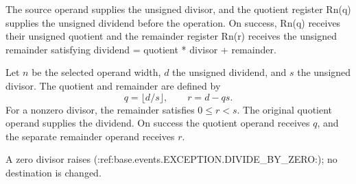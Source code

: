 The source operand supplies the unsigned divisor, and the quotient register Rn(q) supplies the unsigned dividend before the operation. On success, Rn(q) receives their unsigned quotient and the remainder register Rn(r) receives the unsigned remainder satisfying dividend = quotient * divisor + remainder.


Let \(n\) be the selected operand width, \(d\) the unsigned dividend, and \(s\) the unsigned divisor. The quotient and remainder are defined by
\[
  q = \lfloor d/s \rfloor,
  \qquad r = d - qs .
\]
For a nonzero divisor, the remainder satisfies \(0 \le r < s\). The original quotient operand supplies the dividend. On success the quotient operand receives \(q\), and the separate remainder operand receives \(r\).

A zero divisor raises (:ref:base.events.EXCEPTION.DIVIDE_BY_ZERO:); no destination is changed.
